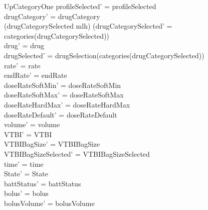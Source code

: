 \begin{schema}{UpCategoryOne}
	profileSelected' = profileSelected\\
	drugCategory' = drugCategory\\ 
	(drugCategorySelected \neq mlh) \land (drugCategorySelected' =\\
	categories(drugCategorySelected))\\
	drug' = drug\\ 
	drugSelected' = drugSelection(categories(drugCategorySelected))\\
	rate' = rate\\
	endRate' = endRate\\
	doseRateSoftMin' = doseRateSoftMin\\
	doseRateSoftMax' = doseRateSoftMax\\
	doseRateHardMax' = doseRateHardMax\\
	doseRateDefault' = doseRateDefault\\
	volume' = volume\\
	VTBI' = VTBI\\
	\pagebreak
	VTBIBagSize' = VTBIBagSize\\ VTBIBagSizeSelected' = VTBIBagSizeSelected\\
	time' = time\\ State' = State\\
	battStatus' = battStatus\\
	bolus' = bolus\\
	bolusVolume' = bolusVolume\\

\end{schema}
